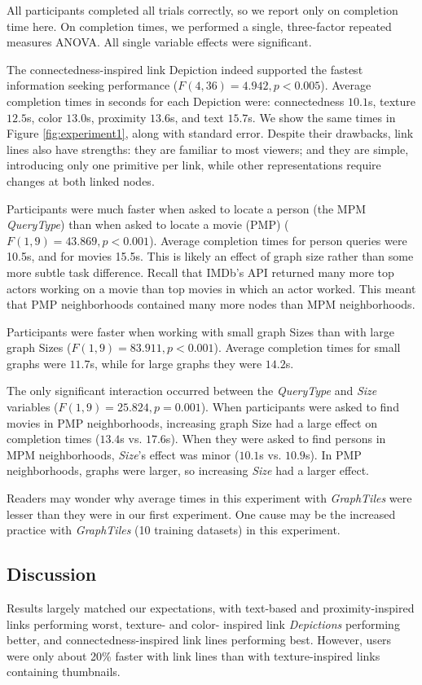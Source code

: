 All participants completed all trials correctly, so we report only on completion time here. On completion times, we performed a single, three-factor repeated measures ANOVA. All single variable effects were significant. 

The connectedness-inspired link Depiction indeed supported the fastest information seeking performance ($F(4,36)=4.942, p<0.005$). Average completion times in seconds for each Depiction were: connectedness $10.1$s, texture $12.5$s, color $13.0$s, proximity $13.6$s, and text $15.7$s. We show the same times in Figure \ref{fig:experiment1}, along with standard error. Despite their drawbacks, link lines also have strengths: they are familiar to most viewers;  and they are simple, introducing only one primitive per link, while other representations require changes at both linked nodes.


Participants were much faster when asked to locate a person (the MPM \textit{QueryType}) than when asked to locate a movie (PMP) ($F(1,9)=43.869, p<0.001$). Average completion times for person queries were 10.5s, and for movies 15.5s. This is likely an effect of graph size rather than some more subtle task difference. Recall that IMDb's API returned many more top actors working on a movie than top movies in which an actor worked. This meant that PMP neighborhoods contained many more nodes than MPM neighborhoods.

Participants were faster when working with small graph Sizes than with large graph Sizes ($F(1,9)=83.911, p<0.001$). Average completion times for small graphs were $11.7$s, while for large graphs they were $14.2$s.

The only significant interaction occurred between the \textit{QueryType} and \textit{Size} variables ($F(1,9)=25.824, p=0.001$). When participants were asked to find movies in PMP neighborhoods, increasing graph Size had a large effect on completion times ($13.4$s vs. $17.6$s). When they were asked to find persons in MPM neighborhoods, \textit{Size}'s effect was minor ($10.1$s vs. $10.9$s). In PMP neighborhoods, graphs were larger, so increasing \textit{Size} had a larger effect.

Readers may wonder why average times in this experiment with \textit{GraphTiles} were lesser than they were in our first experiment. One cause may be the increased practice with \textit{GraphTiles} (10 training datasets) in this experiment.


\subsection{Discussion}
Results largely matched our expectations, with text-based and proximity-inspired links performing worst, texture- and color- inspired link \textit{Depictions} performing better, and connectedness-inspired link lines performing best. However, users were only about 20\% faster with link lines than with texture-inspired links containing thumbnails.


